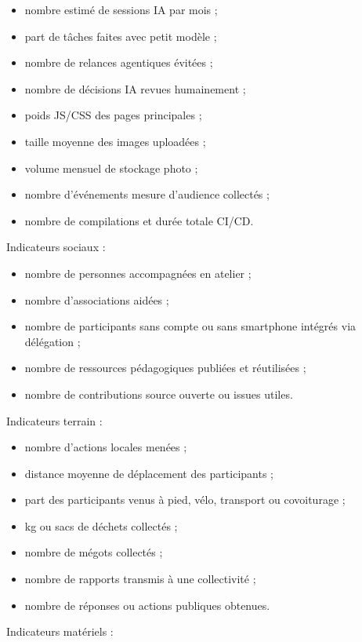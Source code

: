 \documentclass[
  10pt,
  a4paper,
  DIV=11,
  numbers=noendperiod,
  oneside]{scrreprt}
\providecommand{\tightlist}{%
  \setlength{\itemsep}{0pt}\setlength{\parskip}{0pt}}
\begin{document}
\begin{itemize}
\tightlist
\item
  nombre estimé de sessions IA par mois ;
\item
  part de tâches faites avec petit modèle ;
\item
  nombre de relances agentiques évitées ;
\item
  nombre de décisions IA revues humainement ;
\item
  poids JS/CSS des pages principales ;
\item
  taille moyenne des images uploadées ;
\item
  volume mensuel de stockage photo ;
\item
  nombre d'événements mesure d'audience collectés ;
\item
  nombre de compilations et durée totale CI/CD.
\end{itemize}

Indicateurs sociaux :

\begin{itemize}
\tightlist
\item
  nombre de personnes accompagnées en atelier ;
\item
  nombre d'associations aidées ;
\item
  nombre de participants sans compte ou sans smartphone intégrés via
  délégation ;
\item
  nombre de ressources pédagogiques publiées et réutilisées ;
\item
  nombre de contributions source ouverte ou issues utiles.
\end{itemize}

Indicateurs terrain :

\begin{itemize}
\tightlist
\item
  nombre d'actions locales menées ;
\item
  distance moyenne de déplacement des participants ;
\item
  part des participants venus à pied, vélo, transport ou covoiturage ;
\item
  kg ou sacs de déchets collectés ;
\item
  nombre de mégots collectés ;
\item
  nombre de rapports transmis à une collectivité ;
\item
  nombre de réponses ou actions publiques obtenues.
\end{itemize}

Indicateurs matériels :
\end{document}
